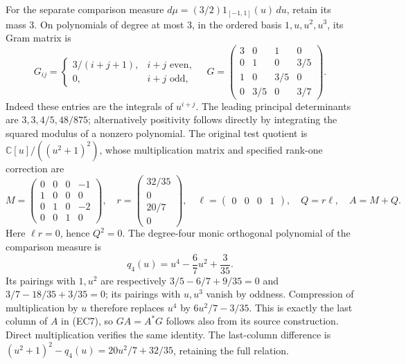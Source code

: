 \documentclass[11pt]{article}
\newcommand{\C}{\mathbb C}
\begin{document}
For the separate comparison measure
\(d\mu=(3/2)1_{[-1,1]}(u)\,du\), retain its mass \(3\).
On polynomials of degree at most \(3\), in the ordered basis
\(1,u,u^2,u^3\), its Gram matrix is
\begin{equation}
 G_{ij}=
 \begin{cases}3/(i+j+1),&i+j\text{ even},\\0,&i+j\text{ odd},\end{cases}
 \quad
 G=\begin{pmatrix}
 3&0&1&0\\0&1&0&3/5\\1&0&3/5&0\\0&3/5&0&3/7
 \end{pmatrix}.
 \tag{EC6}
\end{equation}
Indeed these entries are the integrals of \(u^{i+j}\).
The leading principal determinants are
\(3,3,4/5,48/875\); alternatively positivity follows
directly by integrating the squared modulus of a nonzero polynomial.
The original test quotient is \(\C[u]/((u^2+1)^2)\), whose
multiplication matrix and specified rank-one correction are
\begin{equation}
 M=\begin{pmatrix}
 0&0&0&-1\\1&0&0&0\\0&1&0&-2\\0&0&1&0
 \end{pmatrix},\quad
 r=\begin{pmatrix}32/35\\0\\20/7\\0\end{pmatrix},\quad
 \ell=\begin{pmatrix}0&0&0&1\end{pmatrix},\quad
 Q=r\ell,\quad A=M+Q.
 \tag{EC7}
\end{equation}
Here \(\ell r=0\), hence \(Q^2=0\).
The degree-four monic orthogonal polynomial of the comparison measure is
\[
 q_4(u)=u^4-\frac67u^2+\frac3{35}.
\]
Its pairings with \(1,u^2\) are respectively
\(3/5-6/7+9/35=0\) and
\(3/7-18/35+3/35=0\); its pairings with \(u,u^3\)
vanish by oddness. Compression of multiplication by \(u\)
therefore replaces \(u^4\) by \(6u^2/7-3/35\).
This is exactly the last column of \(A\) in (EC7), so
\(GA=A^*G\) follows also from its source construction.
Direct multiplication verifies the same identity.
The last-column difference is
\((u^2+1)^2-q_4(u)=20u^2/7+32/35\), retaining the full relation.
\end{document}

